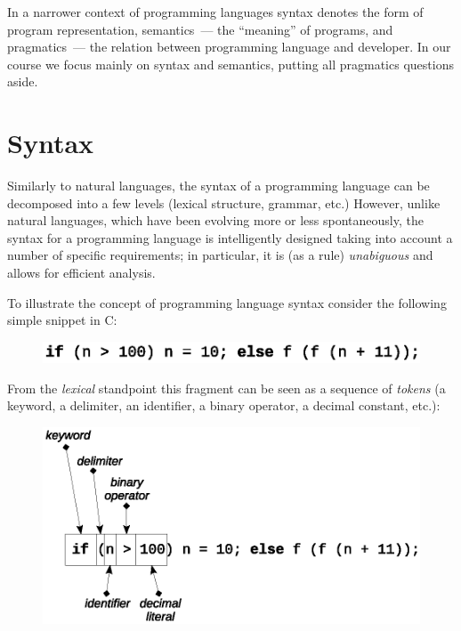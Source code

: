 \documentclass{book}
\newcommand{\lang}[1]{\textsc{#1}}
\begin{document}
In a narrower context of programming languages syntax denotes the form of program representation, semantics~--- the ``meaning'' of programs, and pragmatics~---
the relation between programming language and developer. In our course we focus mainly on syntax and semantics, putting all pragmatics questions aside.

\section{Syntax}

Similarly to natural languages, the syntax of a programming language can be decomposed into a few levels (lexical structure, grammar, etc.) However,
unlike natural languages, which have been evolving more or less spontaneously, the syntax for a programming language is intelligently designed taking
into account a number of specific requirements; in particular, it is (as a rule) \emph{unabiguous} and allows for efficient analysis.

To illustrate the concept of programming language syntax consider the following simple snippet in \lang{C}:

\begin{figure}[h]
  \centering
  \includegraphics[scale=0.7]{images/01-01.eps}
\end{figure}

From the \emph{lexical} standpoint this fragment can be seen as a sequence of \emph{tokens} (a keyword, a delimiter, an identifier, a binary operator,
a decimal constant, etc.):

\begin{figure}[h]
  \centering
  \includegraphics[scale=0.7]{images/01-02.eps}
\end{figure}
\end{document}
